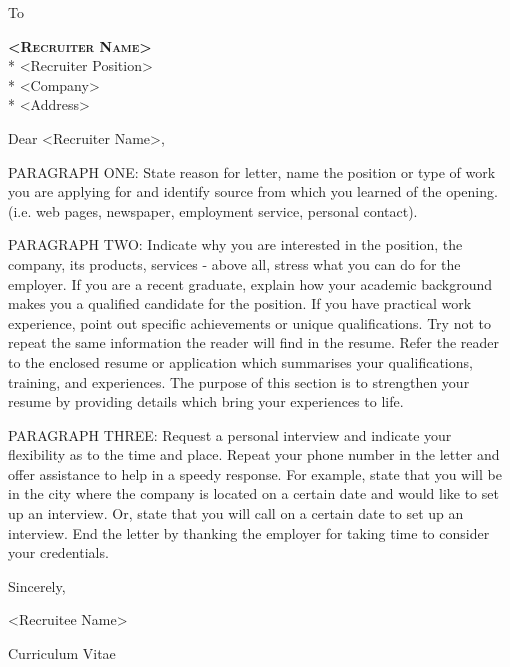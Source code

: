 \documentclass{cv}
\begin{document}
\phantom{}

\vspace{1.5cm}

To

\textbf{\textsc{<Recruiter Name>}} \\*
<Recruiter Position>               \\*
<Company>                          \\*
<Address>

\vspace{2cm}

Dear <Recruiter Name>,

\vspace{1cm}

PARAGRAPH ONE: State reason for letter, name the position
or type of work you are applying for and identify source
from which you learned of the opening. (i.e. web pages, newspaper,
employment service, personal contact).

\vspace{0.5cm}

PARAGRAPH TWO: Indicate why you are interested in the position,
the company, its products, services - above all, stress what you
can do for the employer. If you are a recent graduate, explain
how your academic background makes you a qualified candidate for
the position. If you have practical work experience, point out
specific achievements or unique qualifications. Try not to repeat
the same information the reader will find in the resume. Refer
the reader to the enclosed resume or application which summarises
your qualifications, training, and experiences. The purpose of this
section is to strengthen your resume by providing details which
bring your experiences to life.

\vspace{0.5cm}

PARAGRAPH THREE: Request a personal interview and indicate your
flexibility as to the time and place. Repeat your phone number
in the letter and offer assistance to help in a speedy response.
For example, state that you will be in the city where the company
is located on a certain date and would like to set up an interview.
Or, state that you will call on a certain date to set up an interview.
End the letter by thanking the employer for taking time to consider
your credentials.

\vspace{1.0cm}

Sincerely,

\vspace{0.2cm}

<Recruitee Name>

\vspace{1.0cm}

\faPaperclip \hspace{0.5em} Curriculum Vitae

\end{document}
